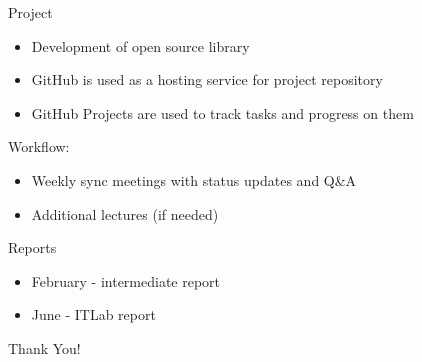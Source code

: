 \documentclass{beamer}
\begin{document}
\begin{frame}{Project}
  \begin{itemize}
    \item Development of open source library
    \item GitHub is used as a hosting service for project repository
    \item GitHub Projects are used to track tasks and progress on them
  \end{itemize}
  Workflow:
  \begin{itemize}
    \item Weekly sync meetings with status updates and Q\&A
    \item Additional lectures (if needed)
  \end{itemize}
\end{frame}

\begin{frame}{Reports}
  \begin{itemize}
    \item February - intermediate report
    \item June - ITLab report
  \end{itemize}
\end{frame}

\begin{frame}
    \centering
    \Huge{Thank You!}
\end{frame}
\end{document}
